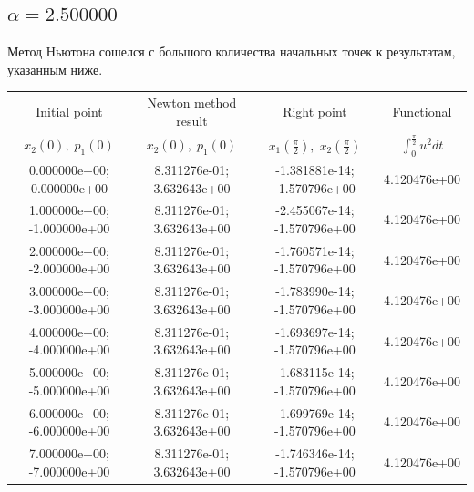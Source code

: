 \documentclass[titlepage]{article}
\def\l{\left}
\def\r{\right}
\begin{document}
\subsection{$\alpha = 2.500000$} 
Метод Ньютона сошелся с большого количества начальных точек к результатам, указанным ниже. \\ 
\begin{tabular}{ | c | c | c | c |} 
\hline 
Initial point  & Newton method result & Right point & Functional 
 \\ $x_2(0), \; p_1(0)$ & $x_2(0), \; p_1(0)$ & $x_1\l(\frac{\pi}{2}\r), \; x_2\l(\frac{\pi}{2}\r)$ & $\int_{0}^{\frac{\pi}{2}}u^2dt$  \\ \hline 
0.000000e+00; 0.000000e+00 & 8.311276e-01; 3.632643e+00 & -1.381881e-14; -1.570796e+00 & 4.120476e+00 \\ \hline 
1.000000e+00; -1.000000e+00 & 8.311276e-01; 3.632643e+00 & -2.455067e-14; -1.570796e+00 & 4.120476e+00 \\ \hline 
2.000000e+00; -2.000000e+00 & 8.311276e-01; 3.632643e+00 & -1.760571e-14; -1.570796e+00 & 4.120476e+00 \\ \hline 
3.000000e+00; -3.000000e+00 & 8.311276e-01; 3.632643e+00 & -1.783990e-14; -1.570796e+00 & 4.120476e+00 \\ \hline 
4.000000e+00; -4.000000e+00 & 8.311276e-01; 3.632643e+00 & -1.693697e-14; -1.570796e+00 & 4.120476e+00 \\ \hline 
5.000000e+00; -5.000000e+00 & 8.311276e-01; 3.632643e+00 & -1.683115e-14; -1.570796e+00 & 4.120476e+00 \\ \hline 
6.000000e+00; -6.000000e+00 & 8.311276e-01; 3.632643e+00 & -1.699769e-14; -1.570796e+00 & 4.120476e+00 \\ \hline 
7.000000e+00; -7.000000e+00 & 8.311276e-01; 3.632643e+00 & -1.746346e-14; -1.570796e+00 & 4.120476e+00 \\ \hline 
\end{tabular} 
\end{document}
